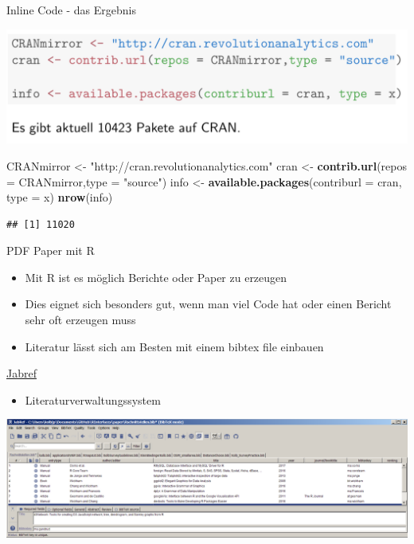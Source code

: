 \documentclass[ignorenonframetext,]{beamer}
\newenvironment{Shaded}{}{}
\newcommand{\KeywordTok}[1]{\textcolor[rgb]{0.00,0.44,0.13}{\textbf{{#1}}}}
\newcommand{\DataTypeTok}[1]{\textcolor[rgb]{0.56,0.13,0.00}{{#1}}}
\newcommand{\StringTok}[1]{\textcolor[rgb]{0.25,0.44,0.63}{{#1}}}
\newcommand{\NormalTok}[1]{{#1}}
\providecommand{\tightlist}{%
\setlength{\itemsep}{0pt}\setlength{\parskip}{0pt}}
\begin{document}
\begin{frame}[fragile]{Inline Code - das Ergebnis}

\includegraphics{./tex2pdf.956/f60740548ad42db8063f482d3e0d7bcc1a5c3422.png}

\begin{Shaded}
\begin{Highlighting}[]
\NormalTok{CRANmirror <-}\StringTok{ "http://cran.revolutionanalytics.com"}
\NormalTok{cran <-}\StringTok{ }\KeywordTok{contrib.url}\NormalTok{(}\DataTypeTok{repos =} \NormalTok{CRANmirror,}\DataTypeTok{type =} \StringTok{"source"}\NormalTok{)}
\NormalTok{info <-}\StringTok{ }\KeywordTok{available.packages}\NormalTok{(}\DataTypeTok{contriburl =} \NormalTok{cran, }\DataTypeTok{type =} \NormalTok{x)}
\KeywordTok{nrow}\NormalTok{(info)}
\end{Highlighting}
\end{Shaded}

\begin{verbatim}
## [1] 11020
\end{verbatim}

\end{frame}

\begin{frame}{PDF Paper mit R}

\begin{itemize}
\tightlist
\item
  Mit R ist es möglich Berichte oder Paper zu erzeugen
\item
  Dies eignet sich besonders gut, wenn man viel Code hat oder einen
  Bericht sehr oft erzeugen muss
\item
  Literatur lässt sich am Besten mit einem bibtex file einbauen
\end{itemize}

\end{frame}

\begin{frame}{\href{http://www.jabref.org/}{Jabref}}

\begin{itemize}
\tightlist
\item
  Literaturverwaltungssystem
\end{itemize}

\includegraphics{./tex2pdf.956/f7708c0137b8eac5334a7a7a7e25e099dda4cc26.png}

\end{frame}
\end{document}
